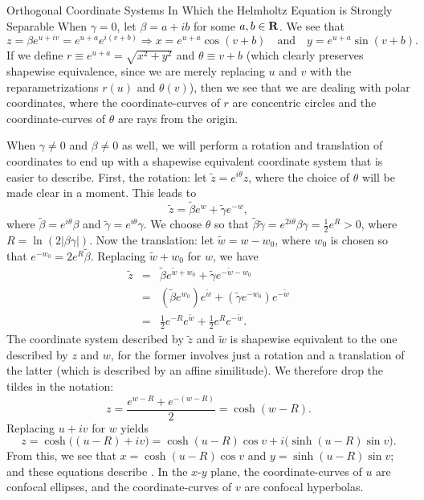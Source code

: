 \begin{section}{Orthogonal Coordinate Systems In Which the Helmholtz Equation is Strongly Separable}
When $\gamma = 0$, let $\beta = a + ib$ for some $a,b \in \mathbf{R}$.  We see that
\[
z = \beta e^{u + iv} = e^{u + a} e^{i(v + b)} \Longrightarrow x = e^{u+a} \cos (v+b)
\quad \mbox{and} \quad
y = e^{u+a} \sin (v+b).
\]
If we define $r \equiv e^{u+a} = \sqrt{x^2 + y^2}$ and $\theta \equiv v+b$ (which clearly preserves shapewise equivalence, since we are merely replacing $u$ and $v$ with the reparametrizations $r(u)$ and $\theta(v)$), then we see that we are dealing with polar coordinates, where the coordinate-curves of $r$ are concentric circles and the coordinate-curves of $\theta$ are rays from the origin.

When $\gamma \not= 0$ and $\beta \not= 0$ as well, we will perform a rotation and translation of coordinates to end up with a shapewise equivalent coordinate system that is easier to describe.  First, the rotation: let $\tilde{z} = e^{i\theta}z$, where the choice of $\theta$ will be made clear in a moment.  This leads to
\[
\tilde{z} = \tilde{\beta} e^w + \tilde{\gamma} e^{-w},
\]
where $\tilde{\beta} = e^{i\theta}\beta$ and $\tilde{\gamma} = e^{i\theta}\gamma$.  We choose $\theta$ so that $\tilde{\beta}\tilde{\gamma} = e^{2i\theta}\beta \gamma = \frac{1}{2}e^R > 0$, where $R = \ln \left( 2\left| \beta \gamma \right| \right)$.  Now the translation: let $\widetilde{w} = w - w_0$, where $w_0$ is chosen so that $e^{-w_0} = 2e^R \tilde{\beta}$.  Replacing $\widetilde{w} + w_0$ for $w$, we have
\begin{eqnarray*}
\tilde{z}	&=& \tilde{\beta}e^{\widetilde{w} + w_0} + \tilde{\gamma}e^{-\widetilde{w} - w_0} \\
		&=& \left( \tilde{\beta}e^{w_0} \right) e^{\widetilde{w}} + \left( \tilde{\gamma}e^{-w_0} \right) e^{-\widetilde{w}} \\
		&=& \frac{1}{2}e^{-R} e^{\widetilde{w}} + \frac{1}{2}e^R e^{-\widetilde{w}}.
\end{eqnarray*}
The coordinate system described by $\tilde{z}$ and $\widetilde{w}$ is shapewise equivalent to the one described by $z$ and $w$, for the former involves just a rotation and a translation of the latter (which is described by an affine similitude).  We therefore drop the tildes in the notation:
\[
z = \frac{e^{w-R} + e^{-(w-R)}}{2} = \cosh (w-R).
\]
Replacing $u + iv$ for $w$ yields
\[
z = \cosh \big( (u - R) + iv \big) = \cosh (u - R) \cos v + i\big( \sinh (u - R) \sin v \big).
\]
From this, we see that $x = \cosh (u - R) \cos v$ and $y = \sinh (u - R) \sin v$; and these equations describe .  In the $x$-$y$ plane, the coordinate-curves of $u$ are confocal ellipses, and the coordinate-curves of $v$ are confocal hyperbolas.


\end{section}
